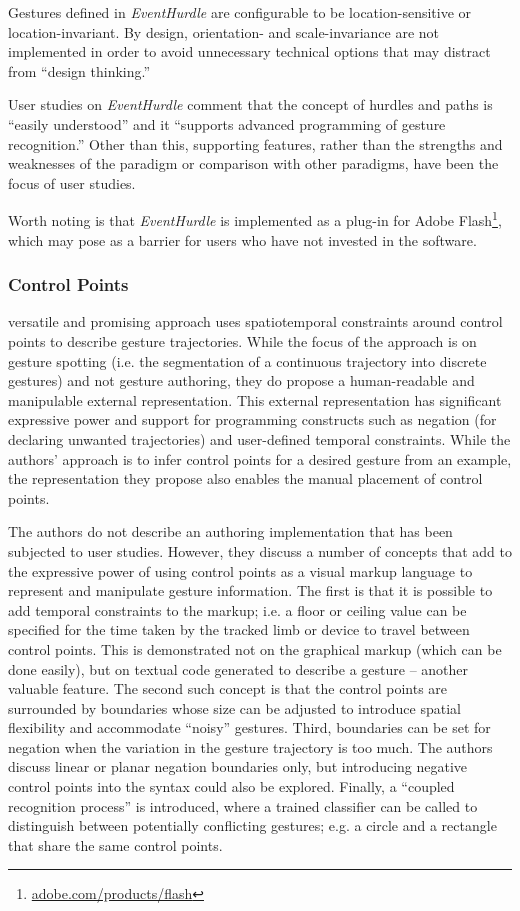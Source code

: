 Gestures defined in \emph{EventHurdle} are configurable to be location-sensitive or location-invariant. By design, orientation- and scale-invariance are not implemented in order to avoid unnecessary technical options that may distract from “design thinking.”

User studies on \emph{EventHurdle} comment that the concept of hurdles and paths is “easily understood” and it “supports advanced programming of gesture recognition.” Other than this, supporting features, rather than the strengths and weaknesses of the paradigm or comparison with other paradigms, have been the focus of user studies.

Worth noting is that \emph{EventHurdle} is implemented as a plug-in for Adobe Flash\footnote{\href{http://www.adobe.com/products/flash.html}{adobe.com/products/flash}}, which may pose as a barrier for users who have not invested in the software.

\subsubsection{Control Points}

 versatile and promising approach uses spatiotemporal constraints around control points to describe gesture trajectories. While the focus of the approach is on gesture spotting (i.e. the segmentation of a continuous trajectory into discrete gestures) and not gesture authoring, they do propose a human-readable and manipulable external representation. This external representation has significant expressive power and support for programming constructs such as negation (for declaring unwanted trajectories) and user-defined temporal constraints. While the authors’ approach is to infer control points for a desired gesture from an example, the representation they propose also enables the manual placement of control points.

The authors do not describe an authoring implementation that has been subjected to user studies. However, they discuss a number of concepts that add to the expressive power of using control points as a visual markup language to represent and manipulate gesture information. The first is that it is possible to add temporal constraints to the markup; i.e. a floor or ceiling value can be specified for the time taken by the tracked limb or device to travel between control points. This is demonstrated not on the graphical markup (which can be done easily), but on textual code generated to describe a gesture – another valuable feature. The second such concept is that the control points are surrounded by boundaries whose size can be adjusted to introduce spatial flexibility and accommodate “noisy” gestures. Third, boundaries can be set for negation when the variation in the gesture trajectory is too much. The authors discuss linear or planar negation boundaries only, but introducing negative control points into the syntax could also be explored. Finally, a “coupled recognition process” is introduced, where a trained classifier can be called to distinguish between potentially conflicting gestures; e.g. a circle and a rectangle that share the same control points.

